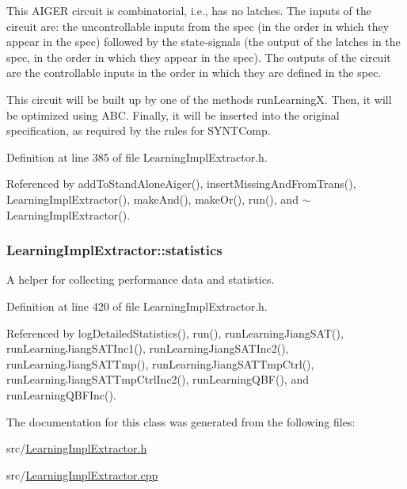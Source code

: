 This A\-I\-G\-E\-R circuit is combinatorial, i.\-e., has no latches. The inputs of the circuit are\-: the uncontrollable inputs from the spec (in the order in which they appear in the spec) followed by the state-\/signals (the output of the latches in the spec, in the order in which they appear in the spec). The outputs of the circuit are the controllable inputs in the order in which they are defined in the spec.

This circuit will be built up by one of the methods run\-Learning\-X. Then, it will be optimized using A\-B\-C. Finally, it will be inserted into the original specification, as required by the rules for S\-Y\-N\-T\-Comp. 

Definition at line 385 of file Learning\-Impl\-Extractor.\-h.



Referenced by add\-To\-Stand\-Alone\-Aiger(), insert\-Missing\-And\-From\-Trans(), Learning\-Impl\-Extractor(), make\-And(), make\-Or(), run(), and $\sim$\-Learning\-Impl\-Extractor().

\hypertarget{classLearningImplExtractor_a018564c4a67dfb228357008a8a50aef4}{
\subsubsection[{statistics}]{ Learning\-Impl\-Extractor\-::statistics\hspace{0.3cm}{\ttfamily [protected]}}}\label{classLearningImplExtractor_a018564c4a67dfb228357008a8a50aef4}


A helper for collecting performance data and statistics. 



Definition at line 420 of file Learning\-Impl\-Extractor.\-h.



Referenced by log\-Detailed\-Statistics(), run(), run\-Learning\-Jiang\-S\-A\-T(), run\-Learning\-Jiang\-S\-A\-T\-Inc1(), run\-Learning\-Jiang\-S\-A\-T\-Inc2(), run\-Learning\-Jiang\-S\-A\-T\-Tmp(), run\-Learning\-Jiang\-S\-A\-T\-Tmp\-Ctrl(), run\-Learning\-Jiang\-S\-A\-T\-Tmp\-Ctrl\-Inc2(), run\-Learning\-Q\-B\-F(), and run\-Learning\-Q\-B\-F\-Inc().



The documentation for this class was generated from the following files\-:\begin{DoxyCompactItemize}
\item 
src/\hyperlink{LearningImplExtractor_8h}{Learning\-Impl\-Extractor.\-h}\item 
src/\hyperlink{LearningImplExtractor_8cpp}{Learning\-Impl\-Extractor.\-cpp}\end{DoxyCompactItemize}

